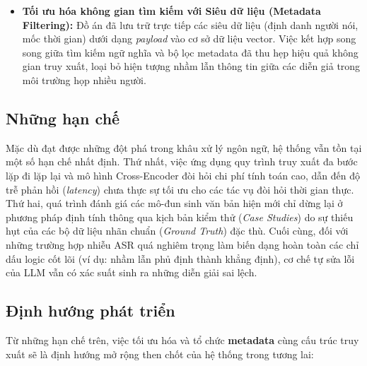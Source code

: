 \begin{itemize}[leftmargin=*, label={}]
    \item \textbf{Tối ưu hóa không gian tìm kiếm với Siêu dữ liệu (Metadata Filtering):} 
    Đồ án đã lưu trữ trực tiếp các siêu dữ liệu (định danh người nói, mốc thời gian) dưới dạng \textit{payload} vào cơ sở dữ liệu vector. Việc kết hợp song song giữa tìm kiếm ngữ nghĩa và bộ lọc metadata đã thu hẹp hiệu quả không gian truy xuất, loại bỏ hiện tượng nhầm lẫn thông tin giữa các diễn giả trong môi trường họp nhiều người.
\end{itemize}

\subsection{Những hạn chế}
Mặc dù đạt được những đột phá trong khâu xử lý ngôn ngữ, hệ thống vẫn tồn tại một số hạn chế nhất định. Thứ nhất, việc ứng dụng quy trình truy xuất đa bước lặp đi lặp lại và mô hình Cross-Encoder đòi hỏi chi phí tính toán cao, dẫn đến độ trễ phản hồi (\textit{latency}) chưa thực sự tối ưu cho các tác vụ đòi hỏi thời gian thực. Thứ hai, quá trình đánh giá các mô-đun sinh văn bản hiện mới chỉ dừng lại ở phương pháp định tính thông qua kịch bản kiểm thử (\textit{Case Studies}) do sự thiếu hụt của các bộ dữ liệu nhãn chuẩn (\textit{Ground Truth}) đặc thù. Cuối cùng, đối với những trường hợp nhiễu ASR quá nghiêm trọng làm biến dạng hoàn toàn các chỉ dấu logic cốt lõi (ví dụ: nhầm lẫn phủ định thành khẳng định), cơ chế tự sửa lỗi của LLM vẫn có xác suất sinh ra những diễn giải sai lệch.

\subsection{Định hướng phát triển}
Từ những hạn chế trên, việc tối ưu hóa và tổ chức \textbf{metadata} cùng cấu trúc truy xuất sẽ là định hướng mở rộng then chốt của hệ thống trong tương lai:

